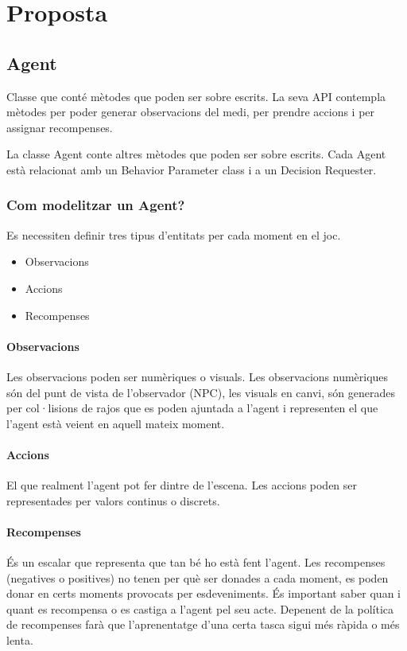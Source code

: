 \documentclass{article}
\begin{document}
    \newpage
    
    \section{Proposta}
    
    \subsection{Agent}
    Classe que conté mètodes que poden ser sobre escrits. La seva API contempla mètodes per poder generar observacions del medi, per prendre accions i per assignar recompenses.

    La classe Agent conte altres mètodes que poden ser sobre escrits. Cada Agent està relacionat amb un Behavior Parameter class i a un Decision Requester.
    
    \subsubsection{Com modelitzar un Agent?}
    Es necessiten definir tres tipus d’entitats per cada moment en el joc.
    
    \begin{itemize}
        \item Observacions
        \item Accions
        \item Recompenses
    \end{itemize}
    
    \paragraph{Observacions}
    
    Les observacions poden ser numèriques o visuals. Les observacions numèriques són del punt de vista de l'observador (NPC), les visuals en canvi, són generades per col·lisions de rajos que es poden ajuntada a l'agent i representen el que l'agent està veient en aquell mateix moment.
    
    \paragraph{Accions}
    
    El que realment l'agent pot fer dintre de l'escena. Les accions poden ser representades per valors continus o discrets.
    
    \paragraph{Recompenses}
   És un escalar que representa que tan bé ho està fent l'agent. Les recompenses (negatives o positives) no tenen per què ser donades a cada moment, es poden donar en certs moments provocats per esdeveniments. És important saber quan i quant es recompensa o es castiga a l'agent pel seu acte. Depenent de la política de recompenses farà que l'aprenentatge d'una certa tasca sigui més ràpida o més lenta.
    
\end{document}
